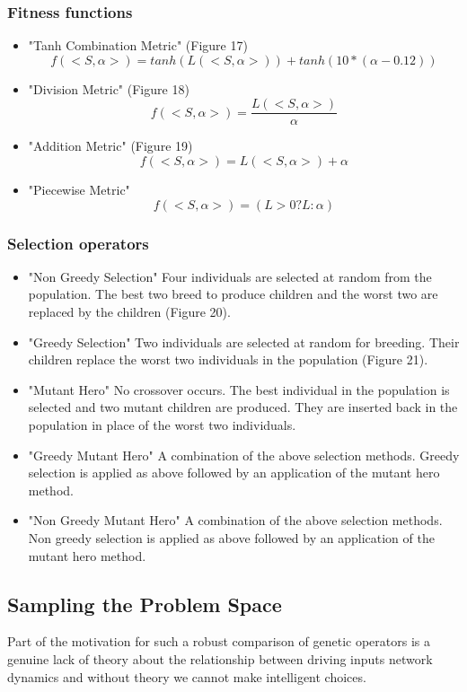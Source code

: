 \documentclass[12pt]{article}
\begin{document}
\subsubsection{Fitness functions}
\begin{itemize}
\item "Tanh Combination Metric" (Figure 17) $$f(<S,\alpha>) = tanh( L( <S, \alpha> ) ) + tanh( 10*(\alpha - 0.12) )$$
\item "Division Metric" (Figure 18) $$f(<S, \alpha>) = \frac{L( <S, \alpha> )}{\alpha}$$
\item "Addition Metric" (Figure 19) $$f(<S, \alpha>) = L( <S, \alpha> ) + \alpha$$
\item "Piecewise Metric" $$f( <S, \alpha>) = (L>0? L : \alpha)$$
\end{itemize}
\subsubsection{Selection operators}
\begin{itemize}
\item "Non Greedy Selection"  Four individuals are selected at random from the population.  The best two breed to produce children and the worst two are
replaced by the children (Figure 20).
\item "Greedy Selection"  Two individuals are selected at random for breeding.
Their children replace the worst two individuals in the population (Figure 21).
\item "Mutant Hero"  No crossover occurs.  The best individual in the population
is selected and two mutant children are produced.  They are inserted back in the
population in place of the worst two individuals.
\item "Greedy Mutant Hero"  A combination of the above selection methods.
Greedy selection is applied as above followed by an application of the mutant
hero method.
\item "Non Greedy Mutant Hero"  A combination of the above selection methods.
Non greedy selection is applied as above followed by an application of the
mutant hero method.
\end{itemize}
\subsection{Sampling the Problem Space}
Part of the motivation for such a robust comparison of genetic operators is
a genuine lack of theory about the relationship between driving inputs
network dynamics and without theory we cannot make intelligent choices.
\end{document}
